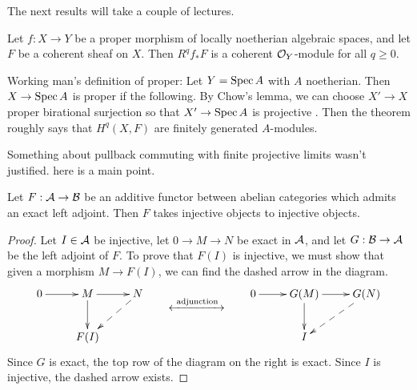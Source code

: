 
 The next results will take a couple of lectures.
 \begin{theorem}
   Let $f:X\to Y$ be a proper morphism of locally noetherian algebraic spaces, and let
   $F$ be a coherent sheaf on $X$. Then $R^q\!f_*F$ is a coherent $\mathcal{O}_Y$-module for
   all $q\ge 0$.
 \end{theorem}
 \begin{remark}
   Working man's definition of proper: Let $Y=\operatorname{Spec} A$ with $A$ noetherian. Then $X\to
   \operatorname{Spec} A$ is proper if the following. By Chow's lemma, we can choose $X'\to X$ proper
   birational surjection so that $X'\to \operatorname{Spec} A$ is projective .  Then the theorem
   roughly says that $H^q(X,F)$ are finitely generated $A$-modules.
 \end{remark}
 Something about pullback commuting with finite projective
 limits wasn't justified. here is a main point. 
 \begin{lemma}\label{lec18L:preserve_injectives}
   Let $F:\mathcal{A}\to \mathcal{B}$ be an additive functor between abelian categories which admits an
   exact left adjoint. Then $F$ takes injective objects to injective objects.
 \end{lemma}
 \begin{proof}
   Let $I\in \mathcal{A}$ be injective, let $0\to M\to N$ be exact in $\mathcal{A}$, and let $G:\mathcal{B}\to \mathcal{A}$
   be the left adjoint of $F$. To prove that $F(I)$ is injective, we must show that given
   a morphism $M\to F(I)$, we can find the dashed arrow in the diagram.
   \[\xymatrix{
    0\ar[r] & M\ar[r]\ar[d] & N \ar@{-->}[dl]\\
    & F(I)
   }\qquad\raisebox{-1pc}{$\xleftrightarrow{\ \text{adjunction}\ }$}\qquad
   \xymatrix{
    0\ar[r] & G(M) \ar[r]\ar[d] & G(N)\ar@{-->}[dl]\\
    & I
   }\]
    Since $G$ is exact, the top row of the diagram on the right is exact. Since $I$ is
   injective, the dashed arrow exists.
 \end{proof}

